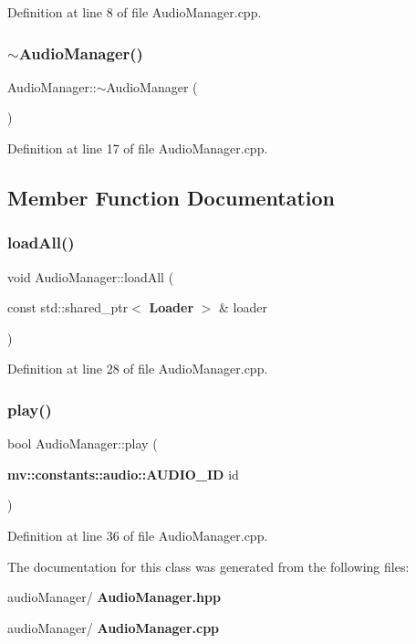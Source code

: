 Definition at line 8 of file Audio\+Manager.\+cpp.

\mbox{\label{class_audio_manager_ad94dc46723c6d7cf8c81fc3772a842aa}} 
\subsubsection{$\sim$\+Audio\+Manager()}
{\footnotesize\ttfamily Audio\+Manager\+::$\sim$\+Audio\+Manager (\begin{DoxyParamCaption}{ }\end{DoxyParamCaption})}



Definition at line 17 of file Audio\+Manager.\+cpp.



\subsection{Member Function Documentation}
\mbox{\label{class_audio_manager_a7f1cf6087d933a6e2c18a31831cc987b}} 
\subsubsection{load\+All()}
{\footnotesize\ttfamily void Audio\+Manager\+::load\+All (\begin{DoxyParamCaption}\item[{const std\+::shared\+\_\+ptr$<$ \textbf{ Loader} $>$ \&}]{loader }\end{DoxyParamCaption})}



Definition at line 28 of file Audio\+Manager.\+cpp.

\mbox{\label{class_audio_manager_afd86074a898aa3b2b81d97ac2c4d818c}} 
\subsubsection{play()}
{\footnotesize\ttfamily bool Audio\+Manager\+::play (\begin{DoxyParamCaption}\item[{\textbf{ mv\+::constants\+::audio\+::\+A\+U\+D\+I\+O\+\_\+\+ID}}]{id }\end{DoxyParamCaption})}



Definition at line 36 of file Audio\+Manager.\+cpp.



The documentation for this class was generated from the following files\+:\begin{DoxyCompactItemize}
\item 
audio\+Manager/\textbf{ Audio\+Manager.\+hpp}\item 
audio\+Manager/\textbf{ Audio\+Manager.\+cpp}\end{DoxyCompactItemize}

